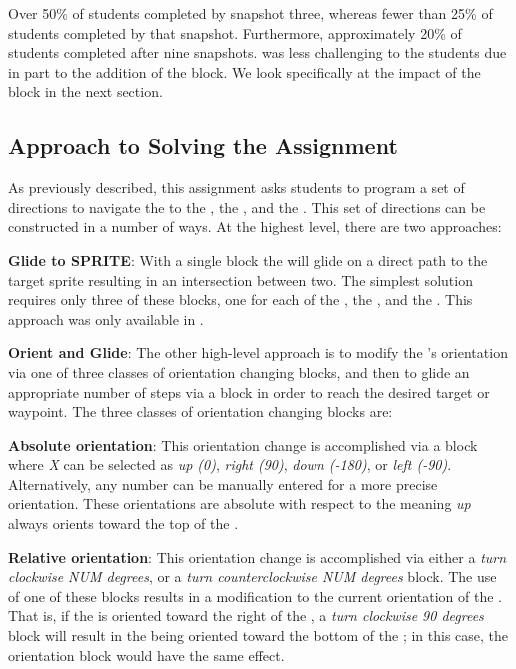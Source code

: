 Over 50\% of \stwo{} students completed by snapshot three, whereas fewer than
25\% of \sone{} students completed by that snapshot. Furthermore, approximately
20\% of \sone{} students completed after nine snapshots. \stwo{} was less
challenging to the students due in part to the addition of the \glideto{}
block. We look specifically at the impact of the \glideto{} block in the next
section.

\subsection{Approach to Solving the Assignment}
As previously described, this assignment asks students to program a set of
directions to navigate the \net{} to \catch{} the \bear{}, the \horse{},
and the \zebra{}. This set of directions can be constructed in a number of
ways. At the highest level, there are two approaches:

\textbf{Glide to SPRITE}: With a single \glideto{} block the \net{} will glide
on a direct path to the target sprite resulting in an intersection between
two. The simplest \com{} solution requires only three of these blocks, one for
each of the \bear{}, the \horse{}, and the \zebra{}. This approach was only
available in \stwo{}.

\textbf{Orient and Glide}: The other high-level approach is to modify the
\net{}'s orientation via one of three classes of orientation changing blocks,
and then to glide an appropriate number of steps via a \glideDIST{} block in
order to reach the desired target or waypoint. The three classes of orientation
changing blocks are:

\textbf{Absolute orientation}: This orientation change is accomplished via a
\pointDIR{} block where \emph{X} can be selected as \emph{up (0)}, \emph{right
  (90)}, \emph{down (-180)}, or \emph{left (-90)}. Alternatively, any number
can be manually entered for a more precise orientation. These orientations are
absolute with respect to the \stage{} meaning \emph{up} always orients toward
the top of the \stage{}.

\textbf{Relative orientation}: This orientation change is accomplished via
either a \emph{turn clockwise NUM degrees}, or a \emph{turn counterclockwise
  NUM degrees} block. The use of one of these blocks results in a modification
to the current orientation of the \net{}. That is, if the \net{} is oriented
toward the right of the \stage{}, a \emph{turn clockwise 90 degrees} block will
result in the \net{} being oriented toward the bottom of the \stage{}; in this
case, the \abs{} orientation block \pointDIR[down]{} would have the same
effect.

